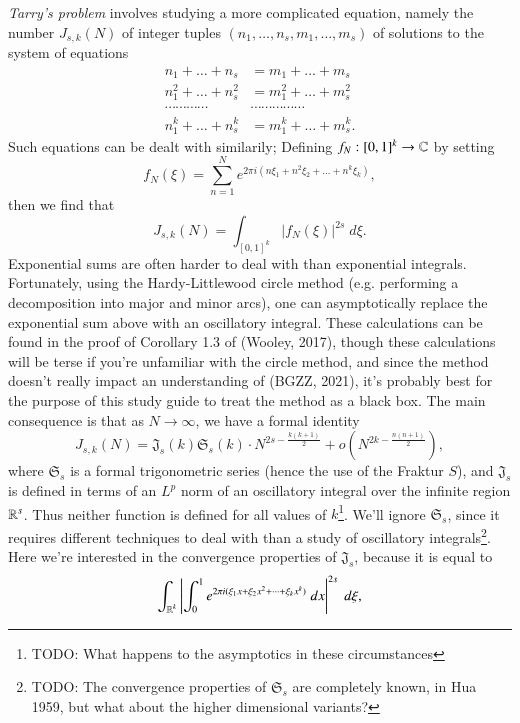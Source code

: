 	\emph{Tarry's problem} involves studying a more complicated equation, namely the number $J_{s,k}(N)$ of integer tuples $(n_1,\dots,n_s,m_1,\dots,m_s)$ of solutions to the system of equations
	\begin{align*}
		n_1 + \dots + n_s &= m_1 + \dots + m_s\\
		n_1^2 + \dots + n_s^2 &= m_1^2 + \dots + m_s^2\\
		\cdots \cdots \cdots \cdots & \cdots \cdots \cdots \cdots \cdots\\
		n_1^k + \dots + n_s^k &= m_1^k + \dots + m_s^k.
	\end{align*}
	Such equations can be dealt with similarily; Defining $f_N: [0,1]^k \to \operatorname{\mathbb{C}}$ by setting
	\[ f_N(\xi) = \sum_{n = 1}^N e^{2 \pi i (n\xi_1 + n^2 \xi_2 + \dots + n^k \xi_k)}, \]
	then we find that
	\begin{equation} \label{discretJskEquation}
		J_{s,k}(N) = \int_{[0,1]^k} |f_N(\xi)|^{2s}\; d\xi.
	\end{equation}
	Exponential sums are often harder to deal with than exponential integrals. Fortunately, using the Hardy-Littlewood circle method (e.g. performing a decomposition into major and minor arcs), one can asymptotically replace the exponential sum above with an oscillatory integral. These calculations can be found in the proof of Corollary 1.3 of (Wooley, 2017), though these calculations will be terse if you're unfamiliar with the circle method, and since the method doesn't really impact an understanding of (BGZZ, 2021), it's probably best for the purpose of this study guide to treat the method as a black box. The main consequence is that as $N \to \infty$, we have a formal identity
	\[ J_{s,k}(N) = \mathfrak{J}_s(k) \mathfrak{S}_s(k) \cdot N^{2s - \frac{k(k+1)}{2}} + o \left( N^{2k - \frac{n(n+1)}{2}} \right), \]
	where $\mathfrak{S}_s$ is a formal trigonometric series (hence the use of the Fraktur $S$), and $\mathfrak{J}_s$ is defined in terms of an $L^p$ norm of an oscillatory integral over the infinite region $\operatorname{\mathbb{R}}^s$. Thus neither function is defined for all values of $k$\footnote{TODO: What happens to the asymptotics in these circumstances}. We'll ignore $\mathfrak{S}_s$, since it requires different techniques to deal with than a study of oscillatory integrals\footnote{TODO: The convergence properties of $\mathfrak{S}_s$ are completely known, in Hua 1959, but what about the higher dimensional variants?}. Here we're interested in the convergence properties of $\mathfrak{J}_s$, because it is equal to
	\begin{equation} \label{JsSingularEquation}
		\int_{\operatorname{\mathbb{R}}^k} \left| \int_0^1 e^{2 \pi i (\xi_1 x + \xi_2 x^2 + \dots + \xi_k x^k)}\; dx \right|^{2s}\; d\xi,
	\end{equation}
